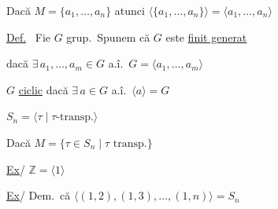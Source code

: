 \documentclass[12pt]{article}
\begin{document}
\bigskip
\noindent Dacă $M=\{a_1,\ldots,a_n\}$ atunci $\langle\{a_1,\ldots,a_n\}\rangle = \langle a_1,\ldots,a_n\rangle$

\bigskip
\noindent\underline{Def.} \ Fie $G$ grup.\ Spunem că $G$ este \underline{finit generat}

\noindent dacă $\exists\,a_1,\ldots,a_m\in G$ a.î.\ $G=\langle a_1,\ldots,a_m\rangle$

\bigskip
\noindent $G$ \underline{ciclic} dacă $\exists\,a\in G$ a.î.\ $\langle a\rangle=G$

\bigskip
\noindent $S_n = \langle \tau \mid \tau\text{-transp.}\rangle$

\noindent Dacă $M=\{\tau\in S_n \mid \tau \text{ transp.}\}$

\bigskip
\noindent\underline{Ex}/ \quad $\mathbb{Z} = \langle 1\rangle$

\bigskip
\noindent\underline{Ex}/ \quad Dem.\ că $\big\langle (1,2),(1,3),\ldots,(1,n)\big\rangle = S_n$
\end{document}
